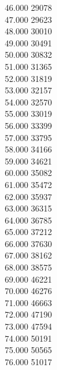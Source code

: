 { 46.000	29078 \\
 47.000	29623 \\
 48.000	30010 \\
 49.000	30491 \\
 50.000	30832 \\
 51.000	31365 \\
 52.000	31819 \\
 53.000	32157 \\
 54.000	32570 \\
 55.000	33019 \\
 56.000	33399 \\
 57.000	33795 \\
 58.000	34166 \\
 59.000	34621 \\
 60.000	35082 \\
 61.000	35472 \\
 62.000	35937 \\
 63.000	36315 \\
 64.000	36785 \\
 65.000	37212 \\
 66.000	37630 \\
 67.000	38162 \\
 68.000	38575 \\
 69.000	46221 \\
 70.000	46276 \\
 71.000	46663 \\
 72.000	47190 \\
 73.000	47594 \\
 74.000	50191 \\
 75.000	50565 \\
 76.000	51017 \\
}
